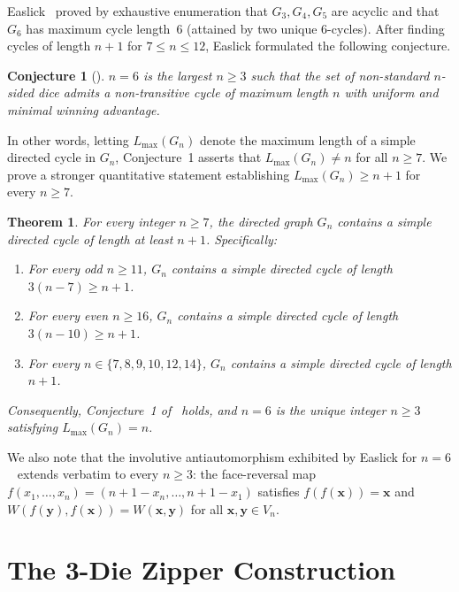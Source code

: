 \documentclass[11pt]{article}
\newtheorem{theorem}{Theorem}
\newtheorem{conjecture}{Conjecture}
\begin{document}
Easlick~\cite[Theorem~1]{easlick2026} proved by exhaustive enumeration that $G_3, G_4, G_5$ are acyclic and that $G_6$ has maximum cycle length~$6$ (attained by two unique $6$-cycles). After finding cycles of length $n+1$ for $7 \le n \le 12$, Easlick formulated the following conjecture.

\begin{conjecture}[{\cite[Conjecture~1]{easlick2026}}]
$n = 6$ is the largest $n \ge 3$ such that the set of non-standard $n$-sided dice admits a non-transitive cycle of maximum length $n$ with uniform and minimal winning advantage.
\end{conjecture}

In other words, letting $L_{\max}(G_n)$ denote the maximum length of a simple directed cycle in $G_n$, Conjecture~1 asserts that $L_{\max}(G_n) \ne n$ for all $n \ge 7$. We prove a stronger quantitative statement establishing $L_{\max}(G_n) \ge n+1$ for every $n \ge 7$.

\begin{theorem}\label{thm:main}
For every integer $n \ge 7$, the directed graph $G_n$ contains a simple directed cycle of length at least $n + 1$. Specifically:
\begin{enumerate}
  \item For every odd $n \ge 11$, $G_n$ contains a simple directed cycle of length $3(n - 7) \ge n + 1$.
  \item For every even $n \ge 16$, $G_n$ contains a simple directed cycle of length $3(n - 10) \ge n + 1$.
  \item For every $n \in \{7, 8, 9, 10, 12, 14\}$, $G_n$ contains a simple directed cycle of length $n + 1$.
\end{enumerate}
Consequently, Conjecture~1 of~\cite{easlick2026} holds, and $n = 6$ is the unique integer $n \ge 3$ satisfying $L_{\max}(G_n) = n$.
\end{theorem}

We also note that the involutive antiautomorphism exhibited by Easlick for $n = 6$~\cite[Prollary~1]{easlick2026} extends verbatim to every $n \ge 3$: the face-reversal map $f(x_1,\dots,x_n) = (n+1-x_n,\dots,n+1-x_1)$ satisfies $f(f(\mathbf{x})) = \mathbf{x}$ and $W(f(\mathbf{y}), f(\mathbf{x})) = W(\mathbf{x}, \mathbf{y})$ for all $\mathbf{x},\mathbf{y} \in V_n$.

\section{The 3-Die Zipper Construction}
\end{document}
